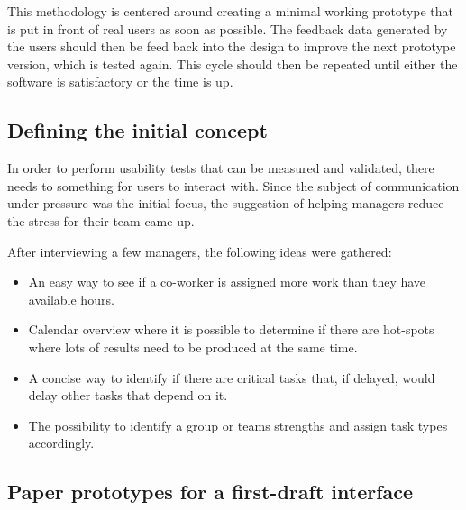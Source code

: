 \documentclass[nofilelist,dvipsnames]{cslthse-msc}
\begin{document}
        This methodology is centered around creating a minimal
        working prototype{\findref} that is put in front of real users as soon
        as possible. The feedback data generated by the users should then be
        feed back into the design to improve the next prototype version, which
        is tested again. This cycle should then be repeated until either the
        software is satisfactory or the time is up.


      \subsection{Defining the initial concept}

        In order to perform usability tests that can be measured and validated,
        there needs to something for users to interact with. Since the subject
        of communication under pressure was the initial focus, the suggestion
        of helping managers reduce the stress for their team came up.

        After interviewing a few managers, the following ideas were
        gathered:

        \begin{itemize}
          \item{
            An easy way to see if a co-worker is assigned more work than they
            have available hours.
          }
          \item{
            Calendar overview where it is possible to determine if there are
            hot-spots where lots of results need to be produced at the same
            time.
          }
          \item{
            A concise way to identify if there are critical tasks that, if
            delayed, would delay other tasks that depend on it.
          }
          \item{
            The possibility to identify a group or teams strengths and assign
            task types accordingly.
          }
        \end{itemize}

      \subsection{Paper prototypes for a first-draft interface}
\end{document}
